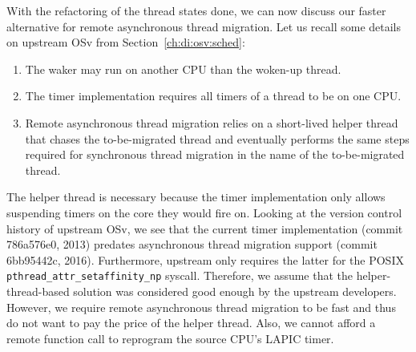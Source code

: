 \documentclass[12pt,a4paper]{book}
\begin{document}
With the refactoring of the thread states done, we can now discuss our faster alternative for remote asynchronous thread migration.
Let us recall some details on upstream OSv from Section~\ref{ch:di:osv:sched}:
\begin{enumerate}[label=(\alph*)]
    \item The waker may run on another CPU than the woken-up thread.
    \item The timer implementation requires all timers of a thread to be on one CPU.
    \item Remote asynchronous thread migration relies on a short-lived helper thread that chases the to-be-migrated thread and eventually performs the same steps required for synchronous thread migration in the name of the to-be-migrated thread.
\end{enumerate}
The helper thread is necessary because the timer implementation only allows suspending timers on the core they would fire on.
Looking at the version control history of upstream OSv, we see that the current timer implementation (commit 786a576e0, 2013) predates asynchronous thread migration support (commit 6bb95442c, 2016).
Furthermore, upstream only requires the latter for the POSIX \lstinline[style=figurecpp]{pthread_attr_setaffinity_np} syscall.
Therefore, we assume that the helper-thread-based solution was considered good enough by the upstream developers.
However, we require remote asynchronous thread migration to be fast and thus do not want to pay the price of the helper thread.
Also, we cannot afford a remote function call to reprogram the source CPU's LAPIC timer.
\end{document}
